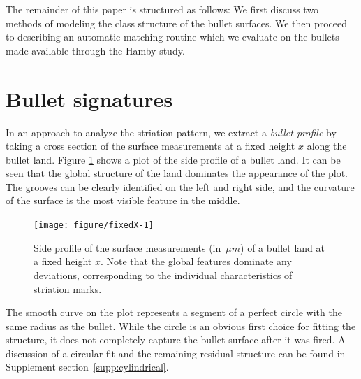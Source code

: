 \documentclass[aoas, preprint]{imsart}\usepackage[]{graphicx}\usepackage[]{color}
\newenvironment{knitrout}{}{} %
\begin{document}
The remainder of this paper is structured as follows: We first discuss two methods of modeling the class structure of the bullet surfaces. %
We then proceed to describing an automatic matching routine which we evaluate on the bullets made available through the Hamby study.

\section{Bullet signatures}

In an approach to analyze the striation pattern, we extract a \emph{bullet profile} \citep{ma:2004} by taking a cross section of the surface measurements at a fixed height $x$ along the bullet land.
Figure \ref{fig:fixedX} shows a plot of the side profile of a bullet land. It can be seen that the global structure of the land dominates the appearance of the plot. The grooves can be clearly identified on the left and right side, and the curvature of the surface is the most visible feature in the middle.

\begin{figure}[hbtp]
  \centering
\begin{knitrout}
\color{fgcolor}
\texttt{[image: figure/fixedX-1]} 

\end{knitrout}
\caption{\label{fig:fixedX}Side profile of the surface measurements (in~$\mu m$) of a bullet land at a fixed height $x$. Note that the global features dominate any deviations, corresponding to the individual characteristics of striation marks.}
\end{figure}

The smooth curve on the plot represents a segment of a perfect circle with the same radius as the bullet. While the circle is an obvious first choice for fitting the structure, it does not completely capture the bullet surface after it was fired. A discussion of a circular fit and the remaining residual structure can be found in Supplement section~\ref{supp:cylindrical}.
\end{document}

